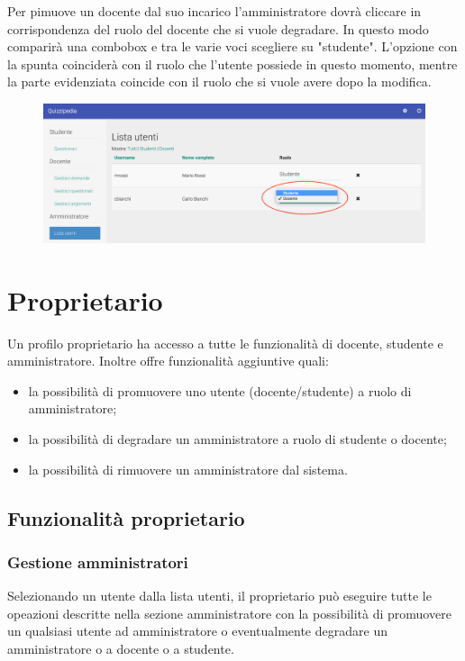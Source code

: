 \documentclass[12pt,a4paper]{article}
\begin{document}
	Per pimuove un docente dal suo incarico l'amministratore dovrà cliccare in corrispondenza del ruolo del docente  che si vuole degradare. In questo modo comparirà una combobox e tra le varie voci scegliere su "studente".
	L'opzione con la spunta coinciderà con il ruolo che l'utente possiede in questo momento, mentre la parte evidenziata coincide con il ruolo che si vuole avere dopo la modifica.
	
		\begin{figure}[H]
			\centering
			\includegraphics[width=1\linewidth]{../img/screenshot/cambioRuoloDocStud.png}
			\caption{}
			\label{Rimozione da ruolo docente}
		\end{figure}
	
	\section{Proprietario} 
	Un profilo proprietario ha accesso a tutte le funzionalità di docente, studente e amministratore.
	Inoltre offre funzionalità aggiuntive quali:
	\begin{itemize}
		\item la possibilità di promuovere uno utente (docente/studente) a ruolo di amministratore;
		\item la possibilità di degradare un amministratore a ruolo di studente o docente;
		\item la possibilità di rimuovere un amministratore dal sistema.
	\end{itemize}
	\subsection{Funzionalità proprietario}
	
	\subsubsection{Gestione  amministratori}
	Selezionando un utente dalla lista utenti, il proprietario può eseguire tutte le opeazioni descritte nella sezione amministratore con la possibilità di promuovere un qualsiasi utente ad amministratore o eventualmente degradare un amministratore o a docente o a studente.
	
\end{document}
